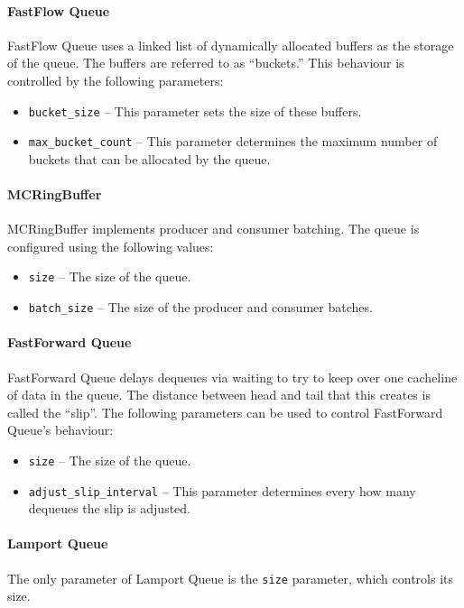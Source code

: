 \paragraph{FastFlow Queue}
FastFlow Queue uses a linked list of dynamically allocated buffers as the storage of the queue. The buffers
are referred to as ``buckets.'' This behaviour is controlled by the following parameters:
\begin{itemize}
    \item \texttt{bucket\_size} -- This parameter sets the size of these buffers.
    \item \texttt{max\_bucket\_count} -- This parameter determines the maximum number of buckets that can be
        allocated by the queue.
\end{itemize}

\paragraph{MCRingBuffer}
MCRingBuffer implements producer and consumer batching. The queue is configured using the following values:
\begin{itemize}
    \item \texttt{size} -- The size of the queue.
    \item \texttt{batch\_size} -- The size of the producer and consumer batches.
\end{itemize}

\paragraph{FastForward Queue}
FastForward Queue delays dequeues via waiting to try to keep over one cacheline of data in the queue. The
distance between head and tail that this creates is called the ``slip''. The following parameters can be used
to control FastForward Queue's behaviour:
\begin{itemize}
    \item \texttt{size} -- The size of the queue.
    \item \texttt{adjust\_slip\_interval} -- This parameter determines every how many dequeues the slip is adjusted.
\end{itemize}

\paragraph{Lamport Queue}
The only parameter of Lamport Queue is the \texttt{size} parameter, which controls its size.

